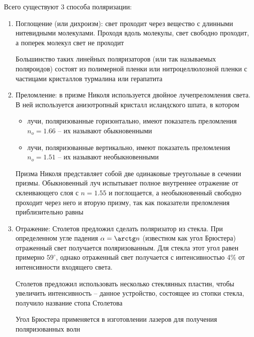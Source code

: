 \documentclass[12pt]{article}
\begin{document}
Всего существуют 3 способа поляризации:

\begin{enumerate}
    \item Поглощение (или дихроизм): свет проходит через вещество с длинными нитевидными молекулами. Проходя вдоль молекулы, свет свободно проходит, а поперек молекул свет не проходит

    Большинство таких линейных поляризаторов (или так называемых поляроидов) состоят из полимерной пленки или нитроцеллюлозной пленки с частицами кристаллов турмалина или герапатита

    \item Преломление: в призме Николя используется двойное лучепреломления света. В ней используется анизотропный кристалл исландского шпата, в котором

    \begin{itemize}
        \item лучи, поляризованные горизонтально, имеют показатель преломления $n_o = 1.66$ -- их называют обыкновенными
        \item лучи, поляризованные вертикально, имеют показатель преломления $n_o = 1.51$ -- их называют необыкновенными
    \end{itemize}

    Призма Николя представляет собой две одинаковые треугольные в сечении призмы. Обыкновенный луч испытывает полное внутреннее отражение от склеивающего слоя с $n = 1.55$ и поглощается, а необыкновенный свободно проходит через него и вторую призму, так как показатели преломления приблизительно равны


    \item Отражение: Столетов предложил сделать поляризатор из стекла. При определенном угле падения $\alpha = \arctg n$ (известном как угол Брюстера) отраженный свет получается поляризованным. Для стекла этот угол равен примерно $59^{\circ}$, однако отраженный свет получается с интенсивностью 4\% от интенсивности входящего света.

    Столетов предложил использовать несколько стеклянных пластин, чтобы увеличить интенсивность -- данное устройство, состоящее из стопки стекла, получило название стопа Столетова

    Угол Брюстера применяется в изготовлении лазеров для получения поляризованных волн 

\end{enumerate}
\end{document}

